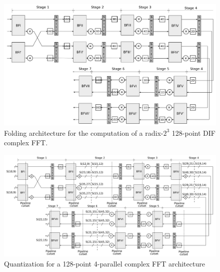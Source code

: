 \documentclass[10pt,times,mathptm,psfig,final,journal,comsoc]{IEEEtran}
\begin{document}






\begin{figure} 
	\centering
	\includegraphics[width=0.6\linewidth]{Diagramas/folding-128.png}
	\caption{Folding architecture for the computation of a radix-$2^3$ 128-point DIF complex FFT.}
	\label{fig:folding_128}
\end{figure}

\begin{figure} 
	\centering
	\includegraphics[width=0.8\linewidth]{Diagramas/folding-128-quant-pipe.png}
	\caption{Quantization for a 128-point 4-parallel complex FFT architecture}
	\label{fig:4paralelo128pradix8cuantizacion1}
\end{figure}
\end{document}

